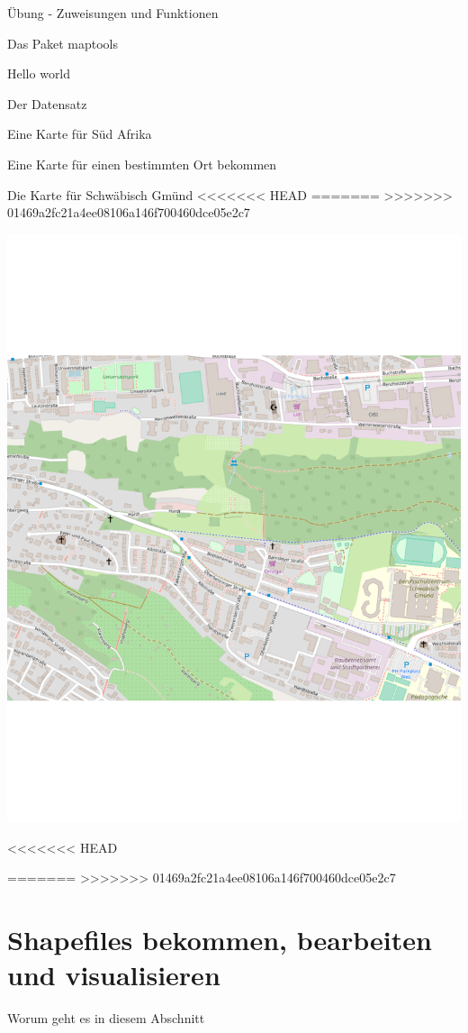 \documentclass[ignorenonframetext,]{beamer}
\begin{document}
\begin{frame}[fragile]{Übung - Zuweisungen und Funktionen}
\begin{frame}[fragile]{Das Paket maptools}
\begin{frame}[fragile]{Hello world}
\begin{frame}[fragile]{Der Datensatz}
\begin{frame}[fragile]{Eine Karte für Süd Afrika}
\begin{frame}[fragile]{Eine Karte für einen bestimmten Ort bekommen}
\end{frame}

\begin{frame}{Die Karte für Schwäbisch Gmünd}
<<<<<<< HEAD
\protect\hypertarget{die-karte-fur-schwabisch-gmund}{}
=======
>>>>>>> 01469a2fc21a4ee08106a146f700460dce05e2c7

\includegraphics{figure/PH_SG.pdf}

\end{frame}

<<<<<<< HEAD
\hypertarget{shapefiles-bekommen-bearbeiten-und-visualisieren}{%
=======
>>>>>>> 01469a2fc21a4ee08106a146f700460dce05e2c7
\section{Shapefiles bekommen, bearbeiten und
visualisieren}\label{shapefiles-bekommen-bearbeiten-und-visualisieren}}

\begin{frame}[fragile]{Worum geht es in diesem Abschnitt}
\protect\hypertarget{worum-geht-es-in-diesem-abschnitt}{}


\end{frame}
\end{frame}
\end{frame}
\end{frame}
\end{frame}
\end{frame}
\end{document}
